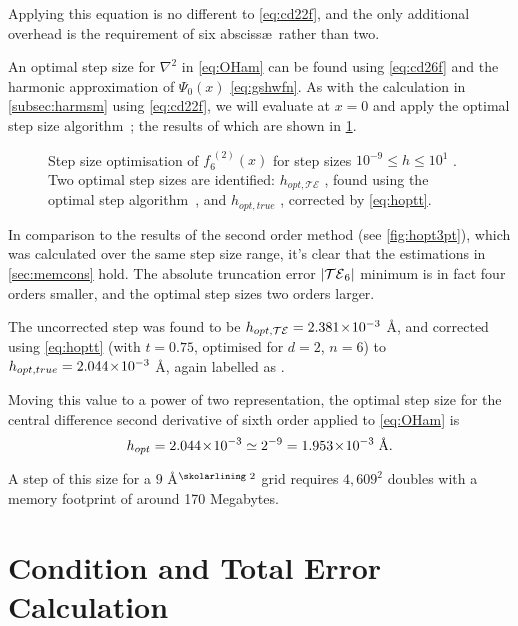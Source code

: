 Applying this equation is no different to \cref{eq:cd22f}, and the only additional overhead is the requirement of six absciss\ae\ rather than two.

An optimal step size for $\nabla^2$ in \cref{eq:OHam} can be found using  \cref{eq:cd26f} and the harmonic approximation of $\Psi_0(x)$ \cref{eq:gshwfn}.
As with the calculation in \cref{subsec:harmsm} using \cref{eq:cd22f}, we will evaluate at $x = 0$ and apply the optimal step size algorithm~\cite{Mathur2012}; the results of which are shown in \cref{fig:hopt7pt}.
\begin{figure}[htp]
\centering
\resizebox{\columnwidth}{!}{}
\caption[Step size optimisation of $f_2^{\;(6)}(x)$]{\label{fig:hopt7pt}Step size optimisation of $f_6^{\;(2)}(x)$ for step sizes $10^{-9}\!\leq\! h\! \leq\! 10^1$ . Two optimal step sizes are identified: $h_{opt,\mathcal{TE}}$ , found using the optimal step algorithm~\cite{Mathur2012}, and $h_{opt,true}$ , corrected by \cref{eq:hoptt}.}
\end{figure}

In comparison to the results of the second order method (see \cref{fig:hopt3pt}), which was calculated over the same step size range, it's clear that the estimations in \cref{sec:memcons} hold.
The absolute truncation error $\left\lvert \mathcal{TE}_6\right\rvert$ minimum is in fact four orders smaller, and the optimal step sizes two orders larger.

The uncorrected step  was found to be $h_{opt,\mathcal{TE}} = 2.381\!\times\!10^{-3}$ Å, and corrected using \cref{eq:hoptt} (with $t=0.75$, optimised for $d=2$, $n=6$) to $h_{opt,true} = 2.044\!\times\!10^{-3}$ Å, again labelled as .

Moving this value to a power of two representation, the optimal step size for the central difference second derivative of sixth order applied to \cref{eq:OHam} is
\begin{equation}
h_{opt} = 2.044\!\times\!10^{-3} \simeq 2^{-9} = 1.953\!\times\!10^{-3}\;\text{Å}.
\end{equation}

A step of this size for a $9$ Å$^\text{\skolarlining 2}$ grid requires $4,609^2$ doubles with a memory footprint of around 170 Megabytes.

\section{Condition and Total Error Calculation}\label{sec:catoterr}

